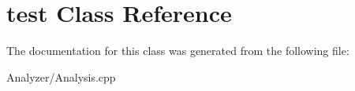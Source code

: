 \hypertarget{classtest}{\section{test Class Reference}
\label{classtest}
}


The documentation for this class was generated from the following file\-:\begin{DoxyCompactItemize}
\item 
Analyzer/Analysis.\-cpp\end{DoxyCompactItemize}
